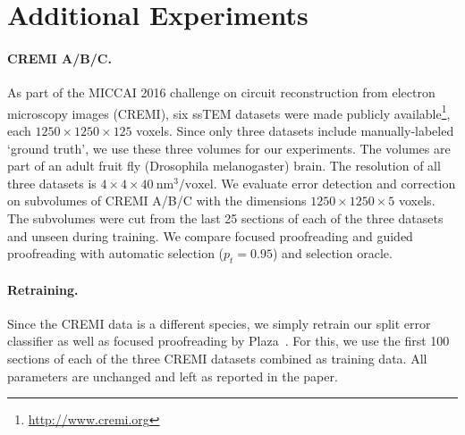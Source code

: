 \section{Additional Experiments}
\label{sec:addexp}

\paragraph{CREMI A/B/C.} As part of the MICCAI 2016 challenge on circuit reconstruction from electron microscopy images (CREMI), six ssTEM datasets were made publicly available\footnote{\scriptsize{\url{http://www.cremi.org}}},  each $1250\times1250\times125$ voxels. Since only three datasets include manually-labeled `ground truth', we use these three volumes for our experiments. The volumes are part of an adult fruit fly (Drosophila melanogaster) brain. The resolution of all three datasets is $4\times4\times40~\text{nm}^3\text{/voxel}$. We evaluate error detection and correction on subvolumes of CREMI A/B/C with the dimensions $1250\times1250\times5$ voxels. The subvolumes were cut from the last 25 sections of each of the three datasets and unseen during training. We compare focused proofreading and guided proofreading with automatic selection ($p_t=0.95$) and selection oracle.

\paragraph{Retraining.} Since the CREMI data is a different species, we simply retrain our split error classifier as well as focused proofreading by Plaza~\cite{focused_proofreading}. For this, we use the first 100 sections of each of the three CREMI datasets combined as training data. All parameters are unchanged and left as reported in the paper. 

